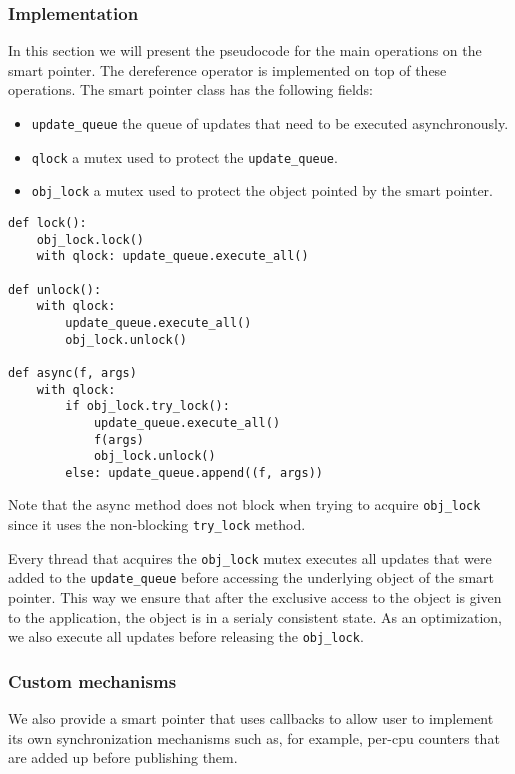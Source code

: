 \subsubsection*{Implementation}

In this section we will present the pseudocode for the main operations on the smart pointer. The dereference operator is implemented on top of these operations. The smart pointer class has the following fields:
\begin{itemize}
\item {\tt update\_queue} the queue of updates that need to be executed asynchronously.
\item {\tt qlock} a mutex used to protect the {\tt update\_queue}.
\item {\tt obj\_lock} a mutex used to protect the object pointed by the smart pointer.
\end{itemize}

\begin{verbatim}
def lock(): 
    obj_lock.lock()
    with qlock: update_queue.execute_all()

def unlock(): 
    with qlock: 
        update_queue.execute_all()
        obj_lock.unlock()

def async(f, args)
    with qlock:
        if obj_lock.try_lock():
            update_queue.execute_all()
            f(args)
            obj_lock.unlock()
        else: update_queue.append((f, args))
\end{verbatim}

Note that the async method does not block when trying to acquire {\tt obj\_lock} since it uses the non-blocking {\tt try\_lock} method. 

Every thread that acquires the {\tt obj\_lock} mutex executes all updates that were added to the {\tt update\_queue} before accessing the underlying object of the smart pointer. This way we ensure that after the exclusive access to the object is given to the application, the object is in a serialy consistent state. As an optimization, we also execute all updates before releasing the {\tt obj\_lock}.

\subsubsection*{Custom mechanisms}

We also provide a smart pointer that uses callbacks to allow user to implement its own synchronization mechanisms such as, for example, per-cpu counters that are added up before publishing them.